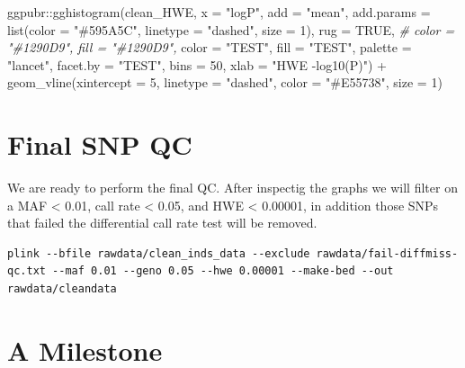 \documentclass[
]{book}
\newenvironment{Shaded}{\begin{snugshade}}{\end{snugshade}}
\newcommand{\AttributeTok}[1]{\textcolor[rgb]{0.77,0.63,0.00}{#1}}
\newcommand{\CommentTok}[1]{\textcolor[rgb]{0.56,0.35,0.01}{\textit{#1}}}
\newcommand{\ConstantTok}[1]{\textcolor[rgb]{0.00,0.00,0.00}{#1}}
\newcommand{\DecValTok}[1]{\textcolor[rgb]{0.00,0.00,0.81}{#1}}
\newcommand{\FunctionTok}[1]{\textcolor[rgb]{0.00,0.00,0.00}{#1}}
\newcommand{\NormalTok}[1]{#1}
\newcommand{\SpecialCharTok}[1]{\textcolor[rgb]{0.00,0.00,0.00}{#1}}
\newcommand{\StringTok}[1]{\textcolor[rgb]{0.31,0.60,0.02}{#1}}
\begin{document}
\begin{Shaded}
\begin{Highlighting}[]
\NormalTok{ggpubr}\SpecialCharTok{::}\FunctionTok{gghistogram}\NormalTok{(clean\_HWE, }\AttributeTok{x =} \StringTok{"logP"}\NormalTok{,}
                    \AttributeTok{add =} \StringTok{"mean"}\NormalTok{,}
                    \AttributeTok{add.params =} \FunctionTok{list}\NormalTok{(}\AttributeTok{color =} \StringTok{"\#595A5C"}\NormalTok{, }\AttributeTok{linetype =} \StringTok{"dashed"}\NormalTok{, }\AttributeTok{size =} \DecValTok{1}\NormalTok{),}
                    \AttributeTok{rug =} \ConstantTok{TRUE}\NormalTok{,}
                    \CommentTok{\# color = "\#1290D9", fill = "\#1290D9",}
                    \AttributeTok{color =} \StringTok{"TEST"}\NormalTok{, }\AttributeTok{fill =} \StringTok{"TEST"}\NormalTok{,}
                    \AttributeTok{palette =} \StringTok{"lancet"}\NormalTok{,}
                    \AttributeTok{facet.by =} \StringTok{"TEST"}\NormalTok{,}
                    \AttributeTok{bins =} \DecValTok{50}\NormalTok{,}
                    \AttributeTok{xlab =} \StringTok{"HWE {-}log10(P)"}\NormalTok{) }\SpecialCharTok{+}
  \FunctionTok{geom\_vline}\NormalTok{(}\AttributeTok{xintercept =} \DecValTok{5}\NormalTok{, }\AttributeTok{linetype =} \StringTok{"dashed"}\NormalTok{,}
                \AttributeTok{color =} \StringTok{"\#E55738"}\NormalTok{, }\AttributeTok{size =} \DecValTok{1}\NormalTok{)}
\end{Highlighting}
\end{Shaded}

\hypertarget{final-snp-qc}{%
\section{Final SNP QC}\label{final-snp-qc}}

We are ready to perform the final QC. After inspectig the graphs we will filter on a MAF \textless{} 0.01, call rate \textless{} 0.05, and HWE \textless{} 0.00001, in addition those SNPs that failed the differential call rate test will be removed.

\begin{verbatim}
plink --bfile rawdata/clean_inds_data --exclude rawdata/fail-diffmiss-qc.txt --maf 0.01 --geno 0.05 --hwe 0.00001 --make-bed --out rawdata/cleandata
\end{verbatim}

\hypertarget{a-milestone}{%
\section{A Milestone}\label{a-milestone}}
\end{document}
